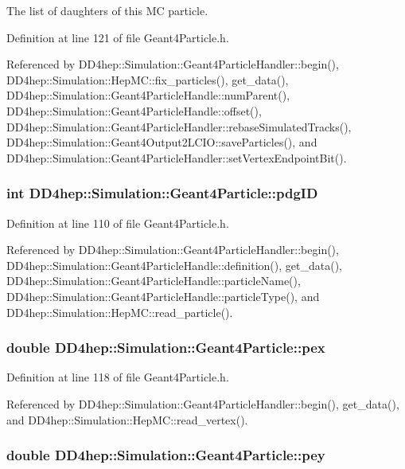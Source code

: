 The list of daughters of this MC particle. 

Definition at line 121 of file Geant4Particle.h.

Referenced by DD4hep::Simulation::Geant4ParticleHandler::begin(), DD4hep::Simulation::HepMC::fix\_\-particles(), get\_\-data(), DD4hep::Simulation::Geant4ParticleHandle::numParent(), DD4hep::Simulation::Geant4ParticleHandle::offset(), DD4hep::Simulation::Geant4ParticleHandler::rebaseSimulatedTracks(), DD4hep::Simulation::Geant4Output2LCIO::saveParticles(), and DD4hep::Simulation::Geant4ParticleHandler::setVertexEndpointBit().\hypertarget{class_d_d4hep_1_1_simulation_1_1_geant4_particle_a0af9d9907bce8d40f3bf0207fb6424c3}{
\subsubsection[{pdgID}]{\setlength{\rightskip}{0pt plus 5cm}int {\bf DD4hep::Simulation::Geant4Particle::pdgID}}}
\label{class_d_d4hep_1_1_simulation_1_1_geant4_particle_a0af9d9907bce8d40f3bf0207fb6424c3}


Definition at line 110 of file Geant4Particle.h.

Referenced by DD4hep::Simulation::Geant4ParticleHandler::begin(), DD4hep::Simulation::Geant4ParticleHandle::definition(), get\_\-data(), DD4hep::Simulation::Geant4ParticleHandle::particleName(), DD4hep::Simulation::Geant4ParticleHandle::particleType(), and DD4hep::Simulation::HepMC::read\_\-particle().\hypertarget{class_d_d4hep_1_1_simulation_1_1_geant4_particle_a6ac77a569db28fb000fa4cd33c6dbc25}{
\subsubsection[{pex}]{\setlength{\rightskip}{0pt plus 5cm}double {\bf DD4hep::Simulation::Geant4Particle::pex}}}
\label{class_d_d4hep_1_1_simulation_1_1_geant4_particle_a6ac77a569db28fb000fa4cd33c6dbc25}


Definition at line 118 of file Geant4Particle.h.

Referenced by DD4hep::Simulation::Geant4ParticleHandler::begin(), get\_\-data(), and DD4hep::Simulation::HepMC::read\_\-vertex().\hypertarget{class_d_d4hep_1_1_simulation_1_1_geant4_particle_a17f6e47420fc54bc5b6440e26f0181e2}{
\subsubsection[{pey}]{\setlength{\rightskip}{0pt plus 5cm}double {\bf DD4hep::Simulation::Geant4Particle::pey}}}
\label{class_d_d4hep_1_1_simulation_1_1_geant4_particle_a17f6e47420fc54bc5b6440e26f0181e2}



